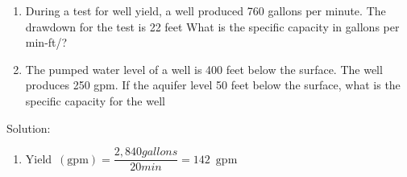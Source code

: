 \begin{enumerate}
\item During a test for well yield, a well produced 760 gallons per minute. The drawdown for the test is 22 feet What is the specific capacity in gallons per min-ft/?

\item The pumped water level of a well is 400 feet below the surface. The well produces  250 gpm.  If the aquifer level 50 feet below the surface, what is the specific capacity for the well

\end{enumerate}

Solution:\\

\begin{enumerate}
\item $\mathrm{Yield \enspace (gpm)}=\dfrac{2,840 gallons}{20 min}=\boxed{142 \enspace \mathrm{gpm}}$


\end{enumerate}
